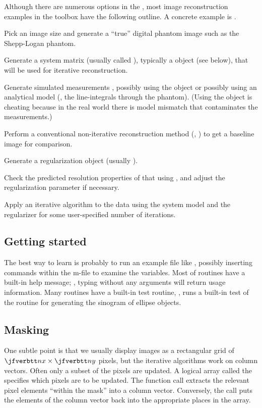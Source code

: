 
Although there are numerous options
in the \irt,
most image reconstruction examples
in the toolbox
have the following outline.
A concrete example
is .

\blist
\item
Pick an image size
and generate a ``true'' digital phantom image
such as the Shepp-Logan phantom.
\item
Generate a system matrix
(usually called ),
typically a \fatrix object (see below),
that will be used for iterative reconstruction.
\item
Generate simulated measurements ,
possibly using the \fatrix object
or possibly using an analytical model
(\eg, the line-integrals through the phantom).
(Using the \fatrix object
is cheating because in the real world
there is model mismatch that contaminates the measurements.)
\item
Perform a conventional non-iterative reconstruction method
(\eg, )
to get a baseline image for comparison.
\item
Generate a regularization object
(usually ).
\item
Check the predicted resolution properties
of that 
using ,
and adjust the regularization parameter \bet
if necessary.
\item
Apply an iterative algorithm
to the data 
using the system model  and the regularizer 
for some user-specified number of iterations.
\elist


\subsection{Getting started}

The best way to learn
is probably to run an example file
like
,
possibly
inserting  commands
within the m-file
to examine the variables.
Most of \irt routines
have a built-in help message;
\eg,
typing 
without any arguments
will return usage information.
Many \irt routines
have a built-in test routine,
\eg,
runs a built-in test
of the routine for generating
the sinogram of ellipse objects.


\subsection{Masking}

One subtle point is that we usually display images
as a rectangular grid of $\ty{nx} \times \ty{ny}$ pixels,
but the iterative algorithms
work on column vectors.
Often only a subset of the pixels are updated.
A logical array called the 
specifies which pixels are to be updated.
The function call
extracts the relevant pixel elements
``within the mask''
into a column vector.
Conversely, the call
puts the elements of the column vector
back into the appropriate places
in the array.


